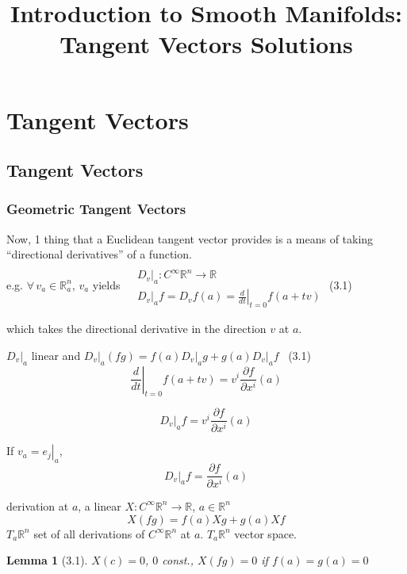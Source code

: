 \documentclass[11pt]{amsart}
\title{Introduction to Smooth Manifolds: Tangent Vectors Solutions}
\newtheorem{lemma}{Lemma}
\theoremstyle{definition}
\begin{document}
\maketitle
\section{Tangent Vectors}


\subsection*{Tangent Vectors}



\subsubsection*{Geometric Tangent Vectors}

Now, 1 thing that a Euclidean tangent vector provides is a means of taking ``directional derivatives'' of a function. \\
e.g. $\forall \, v_a \in \mathbb{R}^n_a$, $v_a$ yields $\begin{aligned} & \quad \\
  & \left. D_v \right|_a : C^{\infty}\mathbb{R}^n \to \mathbb{R} \\
  & \left. D_v \right|_a f  =   D_v f(a) = \left. \frac{d}{dt} \right|_{t=0}f(a+tv) \end{aligned}$ (3.1)

which takes the directional derivative in the direction $v$ at $a$.

$\left. D_v \right|_a$ linear and $\left. D_v \right|_a(fg) = f(a) \left. D_v \right|_a g + g(a) \left. D_v\right|_a f$ \quad \, (3.1)
\[
\left. \frac{d}{dt} \right|_{t=0} f(a+tv) = v^i \frac{\partial f}{ \partial x^i}(a)
\]

\[
 \left. D_v \right|_a f = v^i \frac{ \partial f}{ \partial x^i}(a)
\]

If $v_a = \left. e_j \right|_a$,
\[
\left. D_v \right|_a f = \frac{ \partial f}{ \partial x^i}(a)
\]

derivation at $a$, a linear $X: C^{\infty}\mathbb{R}^n \to \mathbb{R}$, $a\in \mathbb{R}^n$
\[
X(fg) = f(a) Xg + g(a) Xf
\]
$T_a\mathbb{R}^n$ set of all derivations of $C^{\infty}\mathbb{R}^n$ at $a$.  $T_a\mathbb{R}^n$ vector space.

\begin{lemma}[3.1] $X(c) =0$, $0$ const., $X(fg) = 0$ if $f(a) = g(a) =0$ \end{lemma}
\end{document}

